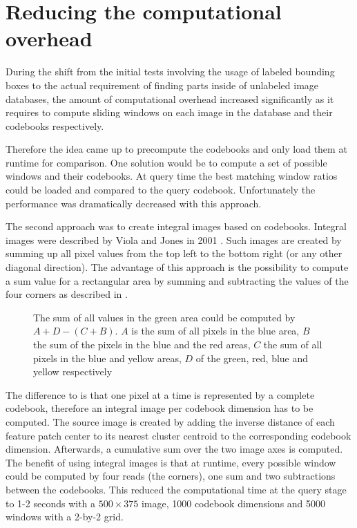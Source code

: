 \section{Reducing the computational overhead}

During the shift from the initial tests involving the usage of labeled bounding boxes to the actual requirement of finding parts inside of unlabeled image databases, the amount of computational overhead increased significantly as it requires to compute sliding windows on each image in the database and their codebooks respectively.

Therefore the idea came up to precompute the codebooks and only load them at runtime for comparison. One solution would be to compute a set of possible windows and their codebooks. At query time the best matching window ratios could be loaded and compared to the query codebook. Unfortunately the performance was dramatically decreased with this approach.

The second approach was to create integral images based on codebooks. Integral images were described by Viola and Jones in 2001 \cite{viola2001rapid}. Such images are created by summing up all pixel values from the top left to the bottom right (or any other diagonal direction). The advantage of this approach is the possibility to compute a sum value for a rectangular area by summing and subtracting the values of the four corners as described in . 

\begin{figure}
\caption[Sum of area in integral image]{The sum of all values in the green area could be computed by $A+D-(C+B)$. $A$ is the sum of all pixels in the blue area, $B$ the sum of the pixels in the blue and the red areas, $C$ the sum of all pixels in the blue and yellow areas, $D$ of the green, red, blue and yellow respectively}
\label{fig:integral_image}
\end{figure}

The difference to \cite{viola2001rapid} is that one pixel at a time is represented by a complete codebook, therefore an integral image per codebook dimension has to be computed. The source image is created by adding the inverse distance of each feature patch center to its nearest cluster centroid to the corresponding codebook dimension. Afterwards, a cumulative sum over the two image axes is computed. The benefit of using integral images is that at runtime, every possible window could be computed by four reads (the corners), one sum and two subtractions between the codebooks. This reduced the computational time at the query stage to 1-2 seconds with a $500\times375$ image, 1000 codebook dimensions and 5000 windows with a 2-by-2 grid.

